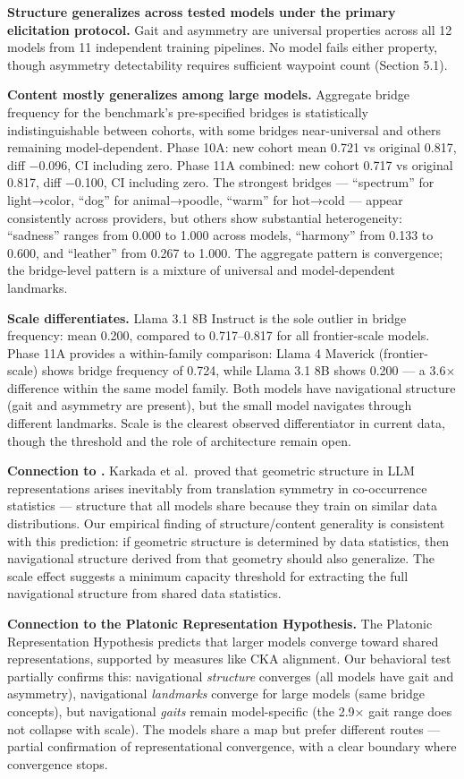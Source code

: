 \textbf{Structure generalizes across tested models under the primary elicitation protocol.} Gait and asymmetry are universal properties across all 12 models from 11 independent training pipelines. No model fails either property, though asymmetry detectability requires sufficient waypoint count (Section 5.1).

\textbf{Content mostly generalizes among large models.} Aggregate bridge frequency for the benchmark's pre-specified bridges is statistically indistinguishable between cohorts, with some bridges near-universal and others remaining model-dependent. Phase 10A: new cohort mean 0.721 vs original 0.817, diff −0.096, CI including zero. Phase 11A combined: new cohort 0.717 vs original 0.817, diff −0.100, CI including zero. The strongest bridges --- ``spectrum'' for light→color, ``dog'' for animal→poodle, ``warm'' for hot→cold --- appear consistently across providers, but others show substantial heterogeneity: ``sadness'' ranges from 0.000 to 1.000 across models, ``harmony'' from 0.133 to 0.600, and ``leather'' from 0.267 to 1.000. The aggregate pattern is convergence; the bridge-level pattern is a mixture of universal and model-dependent landmarks.

\textbf{Scale differentiates.} Llama 3.1 8B Instruct is the sole outlier in bridge frequency: mean 0.200, compared to 0.717--0.817 for all frontier-scale models. Phase 11A provides a within-family comparison: Llama 4 Maverick (frontier-scale) shows bridge frequency of 0.724, while Llama 3.1 8B shows 0.200 --- a 3.6× difference within the same model family. Both models have navigational structure (gait and asymmetry are present), but the small model navigates through different landmarks. Scale is the clearest observed differentiator in current data, though the threshold and the role of architecture remain open.

\textbf{Connection to \citet{karkada2025translation}.} Karkada et al.~proved that geometric structure in LLM representations arises inevitably from translation symmetry in co-occurrence statistics --- structure that all models share because they train on similar data distributions. Our empirical finding of structure/content generality is consistent with this prediction: if geometric structure is determined by data statistics, then navigational structure derived from that geometry should also generalize. The scale effect suggests a minimum capacity threshold for extracting the full navigational structure from shared data statistics.

\textbf{Connection to the Platonic Representation Hypothesis.} The Platonic Representation Hypothesis \citep{huh2024platonic} predicts that larger models converge toward shared representations, supported by measures like CKA alignment. Our behavioral test partially confirms this: navigational \emph{structure} converges (all models have gait and asymmetry), navigational \emph{landmarks} converge for large models (same bridge concepts), but navigational \emph{gaits} remain model-specific (the 2.9× gait range does not collapse with scale). The models share a map but prefer different routes --- partial confirmation of representational convergence, with a clear boundary where convergence stops.

